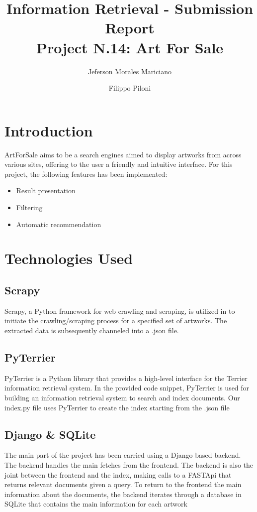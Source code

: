 \documentclass[12pt]{spieman}  %
\title{Information Retrieval - Submission Report \\Project N.14: Art For Sale}
\author{Jeferson Morales Mariciano}
\author{Filippo Piloni}
\affil{Università della Svizzera italiana, Faculty of Informatics, Lugano, Switzerland}
\begin{document}
\maketitle
\tableofcontents

\begin{spacing}{1}   %


    \section{Introduction}
    ArtForSale aims to be a search engines aimed to display artworks from across various sites, offering to the user a friendly and intuitive interface.\newline
    For this project, the following features has been implemented:
    \begin{itemize}
        \item Result presentation
        \item Filtering
        \item Automatic recommendation
    \end{itemize}

    \section{Technologies Used}
    \subsection{Scrapy}
    Scrapy, a Python framework for web crawling and scraping, is utilized in to initiate the crawling/scraping process for a specified set of artworks. The extracted data is subsequently channeled into a .json file.
    \subsection{PyTerrier}
    PyTerrier is a Python library that provides a high-level interface for the Terrier information retrieval system. In the provided code snippet, PyTerrier is used for building an information retrieval system to search and index documents.\newline
    Our index.py file uses PyTerrier to create the index starting from the .json file

    \subsection{Django \& SQLite}
    The main part of the project has been carried using a Django based backend. The backend handles the main fetches from the frontend.
    The backend is also the joint between the frontend and the index, making calls to a FASTApi that returns relevant documents given a query.\newline
    To return to the frontend the main information about the documents, the backend iterates through a database in SQLite that contains the main information for each artwork


\end{spacing}
\end{document}
